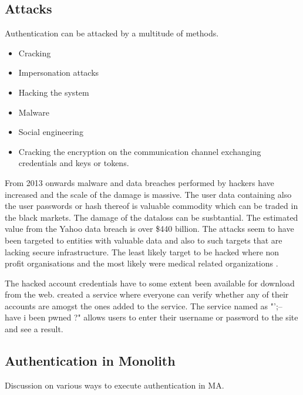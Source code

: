 \subsection{Attacks}
\begin{sloppypar}
    Authentication can be attacked by a multitude of methods.     
    \begin{itemize}
        \item Cracking
        \item Impersonation attacks
        \item Hacking the system
        \item Malware
        \item Social engineering
        \item Cracking the encryption on the communication channel exchanging credentials and keys or tokens.
    \end{itemize}
\end{sloppypar}
\begin{sloppypar}
    From 2013 onwards malware and data breaches performed by hackers have 
    increased and the scale of the damage is massive. The user data containing 
    also the user passwords or hash thereof is valuable commodity which can be 
    traded in the black markets. The damage of the dataloss can be susbtantial. 
    The estimated value from the Yahoo data breach is over \$440 billion. The 
    attacks seem to have been targeted to entities with valuable data and 
    also to such targets that are lacking secure infrastructure. The least likely 
    target to be hacked where non profit organisations and the most likely were 
    medical related organizations \citep{breach}.
\end{sloppypar}
\begin{sloppypar}
    The hacked account credentials have to some extent been available for download 
    from the web. \citet{pwned} created a service where everyone can verify 
    whether any of their accounts are amogst the ones added to the service. 
    The service named as "';-- have i been pwned ?" allows users to enter their 
    username or password to the site and see a result.
\end{sloppypar}

\subsection{Authentication in Monolith}
\begin{sloppypar}
    Discussion on various ways to execute authentication in MA. 
\end{sloppypar}

